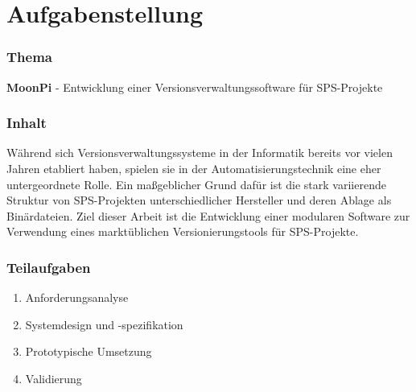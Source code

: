 

\chapter{Aufgabenstellung}


\subsection*{Thema}
%
\leer
\textbf{MoonPi} - Entwicklung einer Versionsverwaltungssoftware für SPS-Projekte
%
\subsection*{Inhalt}

Während sich Versionsverwaltungssysteme in der Informatik bereits vor vielen
Jahren etabliert haben, spielen sie in der Automatisierungstechnik eine eher
untergeordnete Rolle. Ein maßgeblicher Grund dafür ist die stark variierende
Struktur von SPS-Projekten unterschiedlicher Hersteller und deren Ablage als
Binärdateien. Ziel dieser Arbeit ist die Entwicklung einer modularen Software
zur Verwendung eines marktüblichen Versionierungstools für SPS-Projekte.
%
\subsection*{Teilaufgaben}
%
\begin{enumerate}
	\item Anforderungsanalyse
	\item Systemdesign und -spezifikation
	\item Prototypische Umsetzung
	\item Validierung
\end{enumerate}
%
\vspace{0.2cm}
